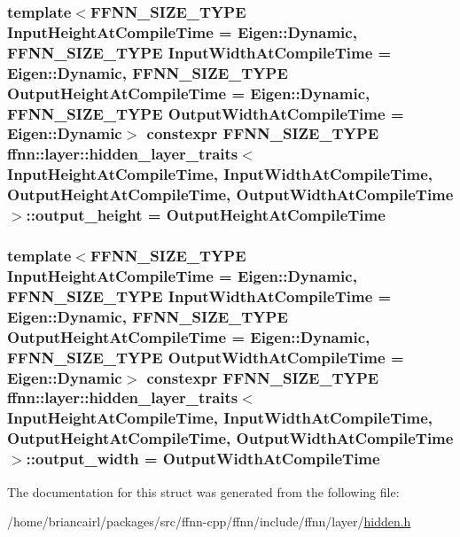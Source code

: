\hypertarget{structffnn_1_1layer_1_1hidden__layer__traits_ac0035aa1ae5f5418ec22f3b549a0b9ca}{
\subsubsection[{output\-\_\-height}]{\setlength{\rightskip}{0pt plus 5cm}template$<$F\-F\-N\-N\-\_\-\-S\-I\-Z\-E\-\_\-\-T\-Y\-P\-E Input\-Height\-At\-Compile\-Time = Eigen\-::\-Dynamic, F\-F\-N\-N\-\_\-\-S\-I\-Z\-E\-\_\-\-T\-Y\-P\-E Input\-Width\-At\-Compile\-Time = Eigen\-::\-Dynamic, F\-F\-N\-N\-\_\-\-S\-I\-Z\-E\-\_\-\-T\-Y\-P\-E Output\-Height\-At\-Compile\-Time = Eigen\-::\-Dynamic, F\-F\-N\-N\-\_\-\-S\-I\-Z\-E\-\_\-\-T\-Y\-P\-E Output\-Width\-At\-Compile\-Time = Eigen\-::\-Dynamic$>$ constexpr {\bf F\-F\-N\-N\-\_\-\-S\-I\-Z\-E\-\_\-\-T\-Y\-P\-E} {\bf ffnn\-::layer\-::hidden\-\_\-layer\-\_\-traits}$<$ Input\-Height\-At\-Compile\-Time, Input\-Width\-At\-Compile\-Time, Output\-Height\-At\-Compile\-Time, Output\-Width\-At\-Compile\-Time $>$\-::output\-\_\-height = Output\-Height\-At\-Compile\-Time\hspace{0.3cm}{\ttfamily [static]}}}\label{structffnn_1_1layer_1_1hidden__layer__traits_ac0035aa1ae5f5418ec22f3b549a0b9ca}
\hypertarget{structffnn_1_1layer_1_1hidden__layer__traits_ab9b8ea313b1b38c02f790ed937927c48}{
\subsubsection[{output\-\_\-width}]{\setlength{\rightskip}{0pt plus 5cm}template$<$F\-F\-N\-N\-\_\-\-S\-I\-Z\-E\-\_\-\-T\-Y\-P\-E Input\-Height\-At\-Compile\-Time = Eigen\-::\-Dynamic, F\-F\-N\-N\-\_\-\-S\-I\-Z\-E\-\_\-\-T\-Y\-P\-E Input\-Width\-At\-Compile\-Time = Eigen\-::\-Dynamic, F\-F\-N\-N\-\_\-\-S\-I\-Z\-E\-\_\-\-T\-Y\-P\-E Output\-Height\-At\-Compile\-Time = Eigen\-::\-Dynamic, F\-F\-N\-N\-\_\-\-S\-I\-Z\-E\-\_\-\-T\-Y\-P\-E Output\-Width\-At\-Compile\-Time = Eigen\-::\-Dynamic$>$ constexpr {\bf F\-F\-N\-N\-\_\-\-S\-I\-Z\-E\-\_\-\-T\-Y\-P\-E} {\bf ffnn\-::layer\-::hidden\-\_\-layer\-\_\-traits}$<$ Input\-Height\-At\-Compile\-Time, Input\-Width\-At\-Compile\-Time, Output\-Height\-At\-Compile\-Time, Output\-Width\-At\-Compile\-Time $>$\-::output\-\_\-width = Output\-Width\-At\-Compile\-Time\hspace{0.3cm}{\ttfamily [static]}}}\label{structffnn_1_1layer_1_1hidden__layer__traits_ab9b8ea313b1b38c02f790ed937927c48}


The documentation for this struct was generated from the following file\-:\begin{DoxyCompactItemize}
\item 
/home/briancairl/packages/src/ffnn-\/cpp/ffnn/include/ffnn/layer/\hyperlink{hidden_8h}{hidden.\-h}\end{DoxyCompactItemize}
